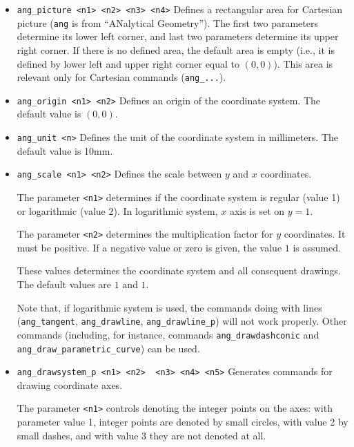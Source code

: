 \documentclass[a4paper]{book}
\begin{document}
\begin{itemize}
\item \verb|ang_picture <n1> <n2> <n3> <n4>|
        Defines a rectangular area for Cartesian picture (\verb|ang| is
        from ``ANalytical Geometry''). The first two parameters determine
        its lower left corner, and last two parameters determine its
        upper right corner. If there is no defined area, the default
        area is empty (i.e., it is defined by lower left and upper right
        corner equal to $(0,0)$). This area is relevant only for
        Cartesian commands (\verb|ang_...|).

\item
\verb|ang_origin <n1> <n2>|
        Defines an origin of the coordinate system. The default value is $(0,0)$.

\item
\verb|ang_unit <n>|
        Defines the unit of the coordinate system in millimeters. The default value is 10mm.

\item
\verb|ang_scale <n1> <n2>|
        Defines the scale between $y$ and $x$ coordinates.

        The parameter \verb|<n1>| determines if the coordinate system is regular (value 1)
        or logarithmic (value 2). In logarithmic system, $x$ axis is set on $y=1$.

        The parameter \verb|<n2>| determines the multiplication factor for $y$ coordinates. It
        must be  positive. If a negative value or zero is given, the value $1$ is assumed.

        These values determines the coordinate system and all consequent drawings.
        The default values are $1$ and $1$.

        Note that, if logarithmic system is used, the commands doing with lines
        (\verb|ang_tangent|, \verb|ang_drawline|, \verb|ang_drawline_p|) will not
        work properly. Other commands (including, for instance, commands
        \verb|ang_drawdashconic| and \verb|ang_draw_parametric_curve|) can be used.

\item
\verb|ang_drawsystem_p <n1> <n2>  <n3> <n4> <n5>|
        Generates commands for drawing coordinate axes.

        The parameter \verb|<n1>| controls denoting the integer points on the axes:
        with parameter value 1, integer points are denoted by small circles,
        with value 2 by small dashes, and with value 3 they are not denoted at all.


\end{itemize}
\end{document}
